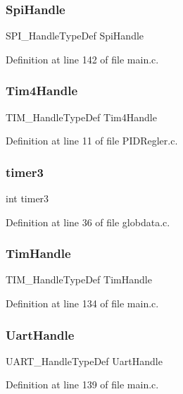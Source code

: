 \subsubsection{Spi\+Handle}
{\footnotesize\ttfamily S\+P\+I\+\_\+\+Handle\+Type\+Def Spi\+Handle}



Definition at line 142 of file main.\+c.

\mbox{\label{group___c_a_n___networking_ga0e997c0c5163f5db2d642ae04e1b11d6}} 
\subsubsection{Tim4\+Handle}
{\footnotesize\ttfamily T\+I\+M\+\_\+\+Handle\+Type\+Def Tim4\+Handle}



Definition at line 11 of file P\+I\+D\+Regler.\+c.

\mbox{\label{group___c_a_n___networking_ga0976503fef01ed7144670e9ffde047b4}} 
\subsubsection{timer3}
{\footnotesize\ttfamily int timer3}



Definition at line 36 of file globdata.\+c.

\mbox{\label{group___c_a_n___networking_gaad0e79d89de05e8451c9b6ac5d88109d}} 
\subsubsection{Tim\+Handle}
{\footnotesize\ttfamily T\+I\+M\+\_\+\+Handle\+Type\+Def Tim\+Handle}



Definition at line 134 of file main.\+c.

\mbox{\label{group___c_a_n___networking_ga2d3238638f25fd8e78b21dc8e5efd348}} 
\subsubsection{Uart\+Handle}
{\footnotesize\ttfamily U\+A\+R\+T\+\_\+\+Handle\+Type\+Def Uart\+Handle}



Definition at line 139 of file main.\+c.


